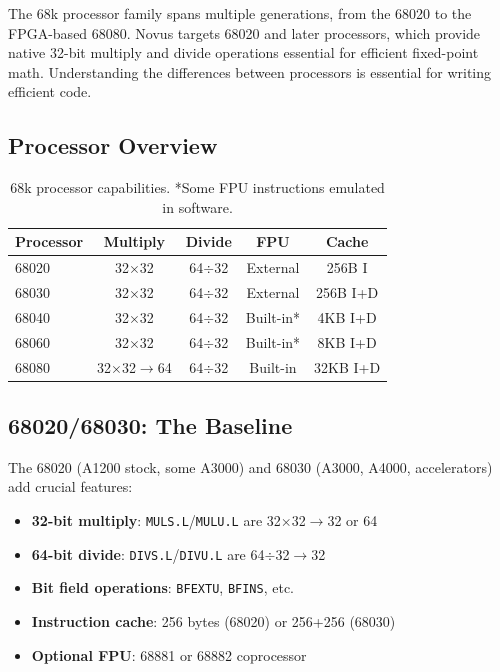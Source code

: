 The 68k processor family spans multiple generations, from the 68020 to the FPGA-based 68080. Novus targets 68020 and later processors, which provide native 32-bit multiply and divide operations essential for efficient fixed-point math. Understanding the differences between processors is essential for writing efficient code.

\subsection{Processor Overview}

\begin{table}[h]
\centering
\small
\begin{tabular}{lcccc}
\textbf{Processor} & \textbf{Multiply} & \textbf{Divide} & \textbf{FPU} & \textbf{Cache} \\
\hline
68020 & 32$\times$32 & 64$\div$32 & External & 256B I \\
68030 & 32$\times$32 & 64$\div$32 & External & 256B I+D \\
68040 & 32$\times$32 & 64$\div$32 & Built-in* & 4KB I+D \\
68060 & 32$\times$32 & 64$\div$32 & Built-in* & 8KB I+D \\
68080 & 32$\times$32$\rightarrow$64 & 64$\div$32 & Built-in & 32KB I+D \\
\end{tabular}
\caption{68k processor capabilities. *Some FPU instructions emulated in software.}
\end{table}

\subsection{68020/68030: The Baseline}

The 68020 (A1200 stock, some A3000) and 68030 (A3000, A4000, accelerators) add crucial features:

\begin{itemize}
\item \textbf{32-bit multiply}: \texttt{MULS.L}/\texttt{MULU.L} are 32$\times$32$\rightarrow$32 or 64
\item \textbf{64-bit divide}: \texttt{DIVS.L}/\texttt{DIVU.L} are 64$\div$32$\rightarrow$32
\item \textbf{Bit field operations}: \texttt{BFEXTU}, \texttt{BFINS}, etc.
\item \textbf{Instruction cache}: 256 bytes (68020) or 256+256 (68030)
\item \textbf{Optional FPU}: 68881 or 68882 coprocessor
\end{itemize}

